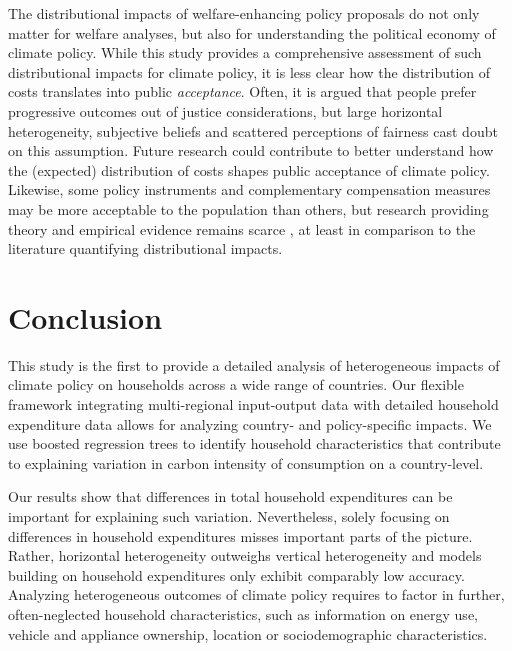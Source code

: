 \documentclass[12pt, a4paper]{article}
\begin{document}
The distributional impacts of welfare-enhancing policy proposals do not only matter for welfare analyses, but also for understanding the political economy of climate policy. While this study provides a comprehensive assessment of such distributional impacts for climate policy, it is less clear how the distribution of costs translates into public \textit{acceptance}. Often, it is argued that people prefer progressive outcomes out of justice considerations, but large horizontal heterogeneity, subjective beliefs \autocite{Douenne.2020} and scattered perceptions of fairness \autocite{MaestreAndres.2019,Povitkina.2021} cast doubt on this assumption. Future research could contribute to better understand how the (expected) distribution of costs shapes public acceptance of climate policy. Likewise, some policy instruments and complementary compensation measures may be more acceptable to the population than others, but research providing theory and empirical evidence remains scarce \autocite[e.g.,][]{Sommer.2022,Valencia.2023}, at least in comparison to the literature quantifying distributional impacts. 

\section{Conclusion} \label{sec:conclusion}

This study is the first to provide a detailed analysis of heterogeneous impacts of climate policy on households across a wide range of countries. Our flexible framework integrating multi-regional input-output data with detailed household expenditure data allows for analyzing country- and policy-specific impacts. We use boosted regression trees to identify household characteristics that contribute to explaining variation in carbon intensity of consumption on a country-level.

Our results show that differences in total household expenditures can be important for explaining such variation. Nevertheless, solely focusing on differences in household expenditures misses important parts of the picture. Rather, horizontal heterogeneity outweighs vertical heterogeneity and models building on household expenditures only exhibit comparably low accuracy. Analyzing heterogeneous outcomes of climate policy requires to factor in further, often-neglected household characteristics, such as information on energy use, vehicle and appliance ownership, location or sociodemographic characteristics.
\end{document}
